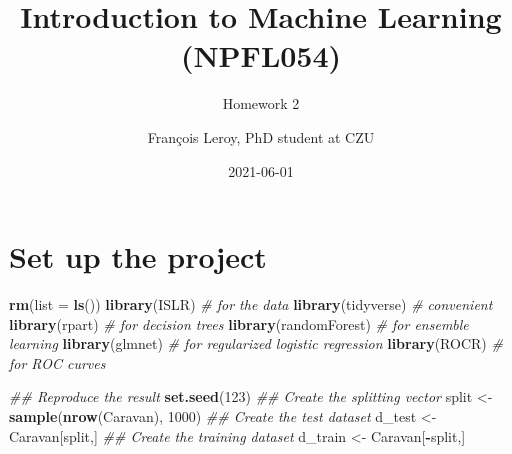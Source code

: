 \documentclass[
  12pt,
  oneside]{report}
\title{Introduction to Machine Learning\\
(NPFL054)}
\subtitle{Homework 2}
\author{François Leroy, PhD student at CZU}
\date{2021-06-01}
\newenvironment{Shaded}{\begin{snugshade}}{\end{snugshade}}
\newcommand{\CommentTok}[1]{\textcolor[rgb]{0.56,0.35,0.01}{\textit{#1}}}
\newcommand{\DataTypeTok}[1]{\textcolor[rgb]{0.13,0.29,0.53}{#1}}
\newcommand{\DecValTok}[1]{\textcolor[rgb]{0.00,0.00,0.81}{#1}}
\newcommand{\KeywordTok}[1]{\textcolor[rgb]{0.13,0.29,0.53}{\textbf{#1}}}
\newcommand{\NormalTok}[1]{#1}
\newcommand{\OperatorTok}[1]{\textcolor[rgb]{0.81,0.36,0.00}{\textbf{#1}}}
\newcommand{\StringTok}[1]{\textcolor[rgb]{0.31,0.60,0.02}{#1}}
\begin{document}
\maketitle


\cleardoublepage 
{}

{
\hypersetup{linkcolor=}
\setcounter{tocdepth}{1}
\tableofcontents
\newpage
}
\vspace{50mm}


\cleardoublepage 
{}


\hypertarget{set-up-the-project}{%
\chapter*{Set up the project}\label{set-up-the-project}}

\begin{Shaded}
\begin{Highlighting}[]
\KeywordTok{rm}\NormalTok{(}\DataTypeTok{list =} \KeywordTok{ls}\NormalTok{())}
\KeywordTok{library}\NormalTok{(ISLR) }\CommentTok{# for the data}
\KeywordTok{library}\NormalTok{(tidyverse) }\CommentTok{# convenient}
\KeywordTok{library}\NormalTok{(rpart) }\CommentTok{# for decision trees}
\KeywordTok{library}\NormalTok{(randomForest) }\CommentTok{# for ensemble learning}
\KeywordTok{library}\NormalTok{(glmnet) }\CommentTok{# for regularized logistic regression}
\KeywordTok{library}\NormalTok{(ROCR) }\CommentTok{# for ROC curves}
\end{Highlighting}
\end{Shaded}

\begin{Shaded}
\begin{Highlighting}[]
\CommentTok{## Reproduce the result}
\KeywordTok{set.seed}\NormalTok{(}\DecValTok{123}\NormalTok{)}
\CommentTok{## Create the splitting vector}
\NormalTok{split <-}\StringTok{ }\KeywordTok{sample}\NormalTok{(}\KeywordTok{nrow}\NormalTok{(Caravan), }\DecValTok{1000}\NormalTok{)}
\CommentTok{## Create the test dataset}
\NormalTok{d_test <-}\StringTok{ }\NormalTok{Caravan[split,]}
\CommentTok{## Create the training dataset}
\NormalTok{d_train <-}\StringTok{ }\NormalTok{Caravan[}\OperatorTok{-}\NormalTok{split,]}
\end{Highlighting}
\end{Shaded}
\end{document}
